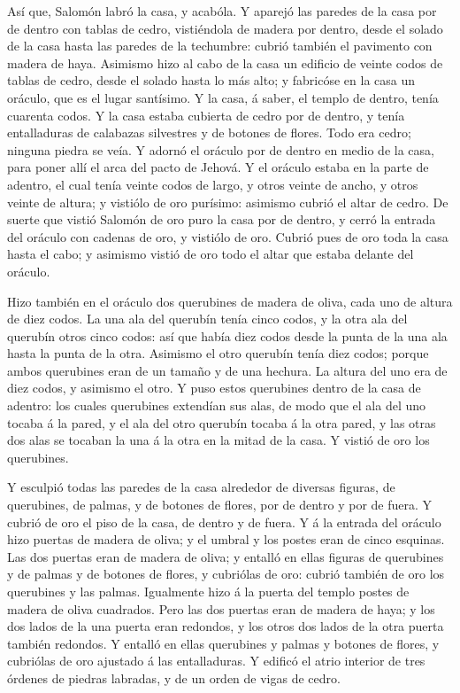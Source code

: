  Así que, Salomón labró la casa, y acabóla.  Y
aparejó las paredes de la casa por de dentro con tablas de cedro,
vistiéndola de madera por dentro, desde el solado de la casa hasta las
paredes de la techumbre: cubrió también el pavimento con madera de haya.
 Asimismo hizo al cabo de la casa un edificio de veinte
codos de tablas de cedro, desde el solado hasta lo más alto; y fabricóse
en la casa un oráculo, que es el lugar santísimo.  Y la
casa, á saber, el templo de dentro, tenía cuarenta codos. 
Y la casa estaba cubierta de cedro por de dentro, y tenía entalladuras
de calabazas silvestres y de botones de flores. Todo era cedro; ninguna
piedra se veía.  Y adornó el oráculo por de dentro en medio
de la casa, para poner allí el arca del pacto de Jehová.  Y
el oráculo estaba en la parte de adentro, el cual tenía veinte codos de
largo, y otros veinte de ancho, y otros veinte de altura; y vistiólo de
oro purísimo: asimismo cubrió el altar de cedro.  De suerte
que vistió Salomón de oro puro la casa por de dentro, y cerró la entrada
del oráculo con cadenas de oro, y vistiólo de oro.  Cubrió
pues de oro toda la casa hasta el cabo; y asimismo vistió de oro todo el
altar que estaba delante del oráculo.

 Hizo también en el oráculo dos querubines de madera de
oliva, cada uno de altura de diez codos.  La una ala del
querubín tenía cinco codos, y la otra ala del querubín otros cinco
codos: así que había diez codos desde la punta de la una ala hasta la
punta de la otra.  Asimismo el otro querubín tenía diez
codos; porque ambos querubines eran de un tamaño y de una hechura.
 La altura del uno era de diez codos, y asimismo el otro.
 Y puso estos querubines dentro de la casa de adentro: los
cuales querubines extendían sus alas, de modo que el ala del uno tocaba
á la pared, y el ala del otro querubín tocaba á la otra pared, y las
otras dos alas se tocaban la una á la otra en la mitad de la casa.
 Y vistió de oro los querubines.

 Y esculpió todas las paredes de la casa alrededor de
diversas figuras, de querubines, de palmas, y de botones de flores, por
de dentro y por de fuera.  Y cubrió de oro el piso de la
casa, de dentro y de fuera.  Y á la entrada del oráculo
hizo puertas de madera de oliva; y el umbral y los postes eran de cinco
esquinas.  Las dos puertas eran de madera de oliva; y
entalló en ellas figuras de querubines y de palmas y de botones de
flores, y cubriólas de oro: cubrió también de oro los querubines y las
palmas.  Igualmente hizo á la puerta del templo postes de
madera de oliva cuadrados.  Pero las dos puertas eran de
madera de haya; y los dos lados de la una puerta eran redondos, y los
otros dos lados de la otra puerta también redondos.  Y
entalló en ellas querubines y palmas y botones de flores, y cubriólas de
oro ajustado á las entalladuras.  Y edificó el atrio
interior de tres órdenes de piedras labradas, y de un orden de vigas de
cedro.


